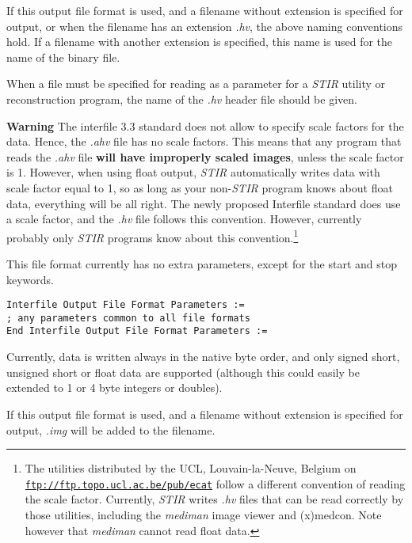 \documentclass{article}
\def\R2Lurl#1#2{\mbox{\href{#1}{\tt #2}}}
\begin{document}
If this output file format is used, and a filename without extension 
is specified for output, or when the filename has an extension \textit{.hv}, 
the above naming conventions hold. If a filename with another 
extension is specified, this name is used for the name of the 
binary file. 


When a file must be specified for reading as a parameter for 
a \textit{STIR} utility or reconstruction program, the name of the \textit{.hv} 
header file should be given. 



\textbf{Warning} The interfile 3.3 standard does not allow to specify 
scale factors for the data. Hence, the \textit{.ahv} file has no scale 
factors. This means that any program that reads the \textit{.ahv} 
file \textbf{will have improperly scaled images}, unless the scale 
factor is 1. However, when using float output, \textit{STIR} automatically 
writes data with scale factor equal to 1, so as long as your 
non-\textit{STIR} program knows about float data, everything will 
be all right. The newly proposed Interfile standard does use 
a scale factor, and the \textit{.hv} file follows this convention. 
However, currently probably only \textit{STIR} programs know about 
this convention.\footnote{{\small The utilities distributed by the UCL, 
Louvain-la-Neuve, Belgium on \R2Lurl{ftp://ftp.topo.ucl.ac.be/pub/ecat }{ftp://ftp.topo.ucl.ac.be/pub/ecat} 
follow a different convention of reading the scale factor. Currently, \textit{STIR} 
writes \textit{.hv} files that can be read correctly by those utilities, 
including the \textit{mediman} image viewer and (x)medcon. Note however 
that \textit{mediman} cannot read float data.}}

{ 
}

This file format currently has no extra parameters, except for 
the start and stop keywords.

\begin{verbatim}
Interfile Output File Format Parameters :=
; any parameters common to all file formats
End Interfile Output File Format Parameters :=
\end{verbatim}

Currently, data is written always in the native byte order, and 
only signed short, unsigned short or float data are supported 
(although this could easily be extended to 1 or 4 byte integers 
or doubles).

{ 
}

If this output file format is used, and a filename without extension 
is specified for output, \textit{.img} will be added to the filename.
\end{document}
